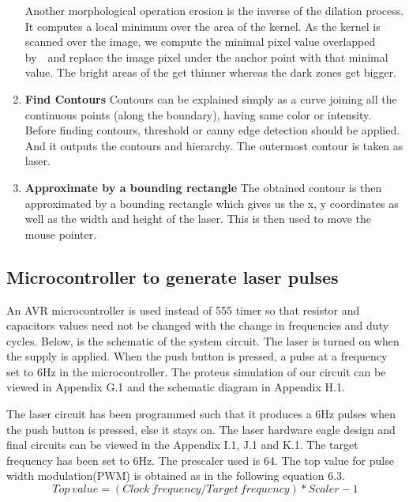 \documentclass[12pt, a4paper]{article}
\begin{document}
\begin{enumerate}
Another morphological operation erosion is the inverse of the dilation process. It computes a local minimum over the area of the kernel. As the kernel is scanned over the image, we compute the minimal pixel value overlapped by  and replace the image pixel under the anchor point with that minimal value. The bright areas of the get thinner whereas the dark zones get bigger.


\item {\textbf{Find Contours}}
Contours can be explained simply as a curve joining all the continuous points (along the boundary), having same color or intensity. Before finding contours, threshold or canny edge detection should be applied. And it outputs the contours and hierarchy.
The outermost contour is taken as laser.

\item{\textbf{Approximate by a bounding rectangle}}
The obtained contour is then approximated by a bounding rectangle which gives us the x, y coordinates as well as the width and height of the laser. This is then used to move the mouse pointer. 

\end{enumerate}
		
\subsection{Microcontroller to generate laser pulses}

	An AVR microcontroller is used instead of 555 timer so that resistor and capacitors values need not be changed with the change in frequencies and duty cycles. Below, is the schematic of the system circuit. The laser is turned on when the supply is applied. When the push button is pressed, a pulse at a frequency set to 6Hz in the microcontroller. The proteus simulation of our circuit can be viewed in Appendix G.1 and the schematic diagram in Appendix H.1. 
	
	The laser circuit has been programmed such that it produces a 6Hz pulses when the push button is pressed, else it stays on. The laser hardware eagle design and final circuits can be viewed in the Appendix I.1, J.1 and K.1. The target frequency has been set to 6Hz. The prescaler used is 64. The top value for pulse width modulation(PWM) is obtained as in the following equation 6.3. 
	\begin{equation}
	Top\ value = (Clock\  frequency/Target\  frequency)*Scaler - 1
	\end{equation}
	
\end{document}
